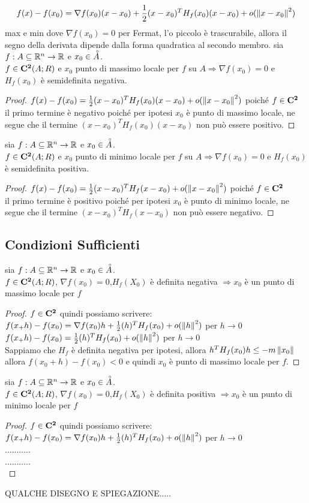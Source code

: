 $$f(x)-f(x_0)=\nabla f(x_0)(x-x_0)+\frac{1}{2}(x-x_0)^TH_f(x_0)(x-x_0)+o(\left\|x-x_0\right\|^2)$$
max e min dove $\nabla f(x_0)=0$ per Fermat, l'o piccolo è trascurabile, allora il segno della derivata dipende dalla forma quadratica al secondo membro.
\proposition
sia $f:A\subseteq \mathbb{R}^n\rightarrow \mathbb{R}$ e $x_0\in\accentset{\circ}{A}$.\\
$f\in \mathbf{C^{2}}(A;R)$ e $x_0$ punto di massimo locale per $f$ su $A\Rightarrow\nabla f(x_0)=0$ e $H_f(x_0)$ è semidefinita negativa.
\begin{proof}
	$f(x)-f(x_0)=\frac{1}{2}(x-x_0)^TH_f(x_0)(x-x_0)+o(\left\|x-x_0\right\|^2)$ poiché $f\in \mathbf{C^{2}}$\\
	il primo termine è negativo poiché per ipotesi $x_0$ è punto di massimo locale, ne segue che il termine $(x-x_0)^TH_f(x_0)(x-x_0)$ non può essere positivo. 
\end{proof} 
\proposition
sia $f:A\subseteq \mathbb{R}^n\rightarrow \mathbb{R}$ e $x_0\in\accentset{\circ}{A}$.\\
$f\in \mathbf{C^{2}}(A;R)$ e $x_0$ punto di minimo locale per $f$ su $A\Rightarrow\nabla f(x_0)=0$ e $H_f(x_0)$ è semidefinita positiva.
\begin{proof}
	$f(x)-f(x_0)=\frac{1}{2}(x-x_0)^TH_f(x-x_0)+o(\left\|x-x_0\right\|^2)$ poiché $f\in \mathbf{C^{2}}$\\
	il primo termine è positivo poiché per ipotesi $x_0$ è punto di minimo locale, ne segue che il termine $(x-x_0)^TH_f(x-x_0)$ non può essere negativo. 
\end{proof} 


\subsection{Condizioni Sufficienti}
\proposition
sia $f:A\subseteq \mathbb{R}^n\rightarrow \mathbb{R}$ e $x_0\in\accentset{\circ}{A}$.\\
$f\in \mathbf{C^{2}}(A;R)$, $\nabla f(x_0)=0$,$H_f(X_0)$ è definita negativa $\Rightarrow x_0$ è un punto di massimo locale per $f$
\begin{proof}
	$f\in \mathbf{C^{2}}$ quindi possiamo scrivere:\\
	$f(x_+h)-f(x_0)=\nabla f(x_0)h+\frac{1}{2}(h)^TH_f(x_0)+o(\left\|h\right\|^2)$ per $h\rightarrow 0$\\
	$f(x_+h)-f(x_0)=\frac{1}{2}(h)^TH_f(x_0)+o(\left\|h\right\|^2)$ per $h\rightarrow 0$\\
	Sappiamo che $H_f$ è definita negativa per ipotesi, allora $h^TH_f(x_0)h\le -m\left\|x_0\right\|$ allora $f(x_0+h)-f(x_0)<0$ e quindi $x_0$ è punto di massimo locale per $f$.
\end{proof} 
\proposition
sia $f:A\subseteq \mathbb{R}^n\rightarrow \mathbb{R}$ e $x_0\in\accentset{\circ}{A}$.\\
$f\in \mathbf{C^{2}}(A;R)$, $\nabla f(x_0)=0$,$H_f(X_0)$ è definita positiva $\Rightarrow x_0$ è un punto di minimo locale per $f$
\begin{proof}
	$f\in \mathbf{C^{2}}$ quindi possiamo scrivere:\\
	$f(x_+h)-f(x_0)=\nabla f(x_0)h+\frac{1}{2}(h)^TH_f(x_0)+o(\left\|h\right\|^2)$ per $h\rightarrow 0$\\
	...........\\
	...........\\
\end{proof} 
QUALCHE DISEGNO E SPIEGAZIONE.....
